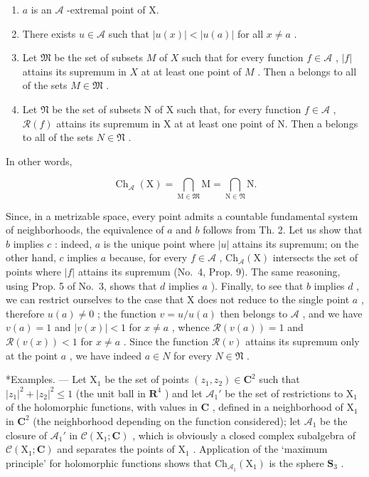 \begin{enumerate}
\def\labelenumi{\alph{enumi})}
\item
  \(a\) is an \(\mathcal{A}\) -extremal point of X.
\item
  There exists \(u \in \mathcal{A}\) such that \(|u(x)| < |u(a)|\) for all \(x \neq a\) .
\item
  Let \(\mathfrak{M}\) be the set of subsets \(M\) of \(X\) such that for every function \(f \in \mathcal{A}\) , \(|f|\) attains its supremum in \(X\) at at least one point of \(M\) . Then a belongs to all of the sets \(M \in \mathfrak{M}\) .
\item
  Let \(\mathfrak{N}\) be the set of subsets N of X such that, for every function \(f \in \mathcal{A}\) , \(\mathcal{R}(f)\) attains its supremum in X at at least one point of N. Then a belongs to all of the sets \(N \in \mathfrak{N}\) .
\end{enumerate}

In other words,

\[
\operatorname{Ch} _ {\mathcal {A}} (\mathrm{X}) = \bigcap_ {\mathrm{M} \in \mathfrak {M}} \mathrm{M} = \bigcap_ {\mathrm{N} \in \mathfrak {N}} \mathrm{N}.\tag{18}
\]

Since, in a metrizable space, every point admits a countable fundamental system of neighborhoods, the equivalence of \(a\) and \(b\) follows from Th. 2. Let us show that \(b\) implies \(c\) : indeed, \(a\) is the unique point where \(|u|\) attains its supremum; on the other hand, \(c\) implies \(a\) because, for every \(f \in \mathcal{A}\) , \(\mathrm{Ch}_{\mathcal{A}}(\mathrm{X})\) intersects the set of points where \(|f|\) attains its supremum (No.~4, Prop. 9). The same reasoning, using Prop. 5 of No.~3, shows that \(d\) implies \(a\) ). Finally, to see that \(b\) implies \(d\) , we can restrict ourselves to the case that X does not reduce to the single point \(a\) , therefore \(u(a) \neq 0\) ; the function \(v = u / u(a)\) then belongs to \(\mathcal{A}\) , and we have \(v(a) = 1\) and \(|v(x)| < 1\) for \(x \neq a\) , whence \(\mathcal{R}(v(a)) = 1\) and \(\mathcal{R}(v(x)) < 1\) for \(x \neq a\) . Since the function \(\mathcal{R}(v)\) attains its supremum only at the point \(a\) , we have indeed \(a \in N\) for every \(N \in \mathfrak{N}\) .

*Examples. --- Let \(\mathrm{X}_1\) be the set of points \((z_1, z_2) \in \mathbf{C}^2\) such that \(|z_1|^2 + |z_2|^2 \leqslant 1\) (the unit ball in \(\mathbf{R}^4\) ) and let \(\mathcal{A}_1'\) be the set of restrictions to \(\mathrm{X}_1\) of the holomorphic functions, with values in \(\mathbf{C}\) , defined in a neighborhood of \(\mathrm{X}_1\) in \(\mathbf{C}^2\) (the neighborhood depending on the function considered); let \(\mathcal{A}_1\) be the closure of \(\mathcal{A}_1'\) in \(\mathcal{C}(\mathrm{X}_1; \mathbf{C})\) , which is obviously a closed complex subalgebra of \(\mathcal{C}(\mathrm{X}_1; \mathbf{C})\) and separates the points of \(\mathrm{X}_1\) . Application of the `maximum principle' for holomorphic functions shows that \(\mathrm{Ch}_{\mathcal{A}_1}(\mathrm{X}_1)\) is the sphere \(\mathbf{S}_3\) .


